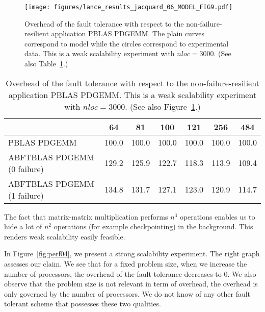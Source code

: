 \documentclass[pdftex,11pt]{article}
\begin{document}
\begin{figure}
  \begin{center}
    \texttt{[image: figures/lance\_results\_jacquard\_06\_MODEL\_FIG9.pdf]}
  \end{center}
  \color{DodgerBlue4}
  \caption{\label{fig:perf03} \color{black} Overhead of the fault
    tolerance with respect to the non-failure-resilient application
    PBLAS PDGEMM.  The plain curves correspond to model while the
    circles correspond to experimental data.  This is a weak
    scalability experiment with $nloc=3000$.  (See also
    Table~\ref{tab:perf03}.)  }
\end{figure}

\begin{table}
  \begin{center}
    \begin{tabular}{|l||c|c|c|c|c|c|}
      \hline
      &   64        &   81        &  100        &  121        &  256        &  484        \\
      \hline
      PBLAS PDGEMM                &  100.0      &  100.0      &  100.0      &  100.0      &  100.0      &  100.0      \\
      ABFTBLAS PDGEMM (0 failure) &  129.2      &  125.9      &  122.7      &  118.3      &  113.9      &  109.4      \\
      ABFTBLAS PDGEMM (1 failure) &  134.8      &  131.7      &  127.1      &  123.0      &  120.9      &  114.7      \\
      \hline
    \end{tabular}
  \end{center}
  \color{DodgerBlue4}
  \caption{\label{tab:perf03}
    \color{black}
    Overhead of the fault tolerance with respect to the non-failure-resilient application PBLAS PDGEMM.
    This is a weak scalability experiment with $nloc=3000$.
    (See also Figure~\ref{fig:perf03}.)
  }
\end{table}

The fact that matrix-matrix multiplication performs $n^3$ operations
enables us to hide a lot of $n^2$ operations (for example
checkpointing) in the background.  This renders weak scalability
easily feasible.

In Figure~\ref{fig:perf04}, we present a strong scalability
experiment.  The right graph assesses our claim. We see that for a
fixed problem size, when we increase the number of processors, the
overhead of the fault tolerance decreases to 0. We also observe that
the problem size is not relevant in term of overhead, the overhead is
only governed by the number of processors. We do not know of any other
fault tolerant scheme that possesses these two qualities.
\end{document}
